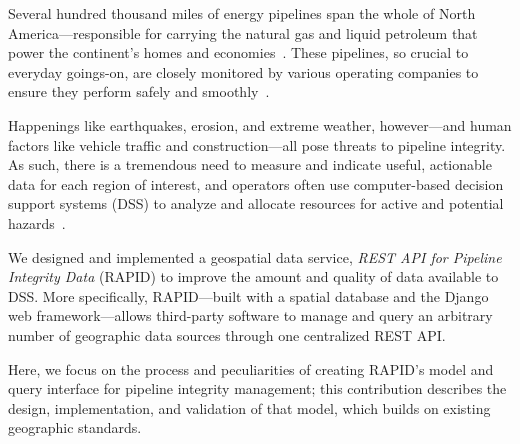 Several hundred thousand miles of energy pipelines span the whole of North America---responsible for carrying the natural gas and liquid petroleum that power the continent's homes and economies~\cite{PHMSA}. These pipelines, so crucial to everyday goings-on, are closely monitored by various operating companies to ensure they perform safely and smoothly~\cite{PHMSA2013}. 

Happenings like earthquakes, erosion, and extreme weather, however---and human factors like vehicle traffic and construction---all pose threats to pipeline integrity. As such, there is a tremendous need to measure and indicate useful, actionable data for each region of interest, and operators often use computer-based decision support systems (DSS) to analyze and allocate resources for active and potential hazards~\cite{PHMSA2013,MichaelBakerJr.2008,Chastain,Dunning2013}.

We designed and implemented a geospatial data service, \textit{REST API for Pipeline Integrity Data} (RAPID) to improve the amount and quality of data available to DSS. More specifically, RAPID---built with a spatial database and the Django web framework---allows third-party software to manage and query an arbitrary number of geographic data sources through one centralized REST API.

Here, we focus on the process and peculiarities of creating RAPID's model and query interface for pipeline integrity management; this contribution describes the design, implementation, and validation of that model, which builds on existing geographic standards.
